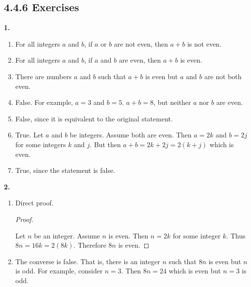 \documentclass[10pt,]{book}
\theoremstyle{plain}
\theoremstyle{definition}
\theoremstyle{definition}
\theoremstyle{definition}
\numberwithin{equation}{chapter}
\begin{document}
\subsection*{4.4.6 Exercises}
\noindent\textbf{1.}\quad{}\leavevmode%
\begin{enumerate}[label=(\alph*)]
\item\hypertarget{li-1098}{}
For all integers \(a\) and \(b\), if \(a\) or \(b\) are not even, then \(a+b\) is not even.
%
\item\hypertarget{li-1099}{}
For all integers \(a\) and \(b\), if \(a\) and \(b\) are even, then \(a+b\) is even.
%
\item\hypertarget{li-1100}{}
There are numbers \(a\) and \(b\) such that \(a+b\) is even but \(a\) and \(b\) are not both even.
%
\item\hypertarget{li-1101}{}
False.  For example, \(a = 3\) and \(b = 5\).  \(a+b = 8\), but neither \(a\) nor \(b\) are even.
%
\item\hypertarget{li-1102}{}
False, since it is equivalent to the original statement.
%
\item\hypertarget{li-1103}{}
True.  Let \(a\) and \(b\) be integers.  Assume both are even.  Then \(a = 2k\) and \(b = 2j\) for some integers \(k\) and \(j\).  But then \(a+b = 2k + 2j = 2(k+j)\) which is even.
%
\item\hypertarget{li-1104}{}
True, since the statement is false.
%
\end{enumerate}
\par\smallskip
\noindent\textbf{2.}\quad{}\leavevmode%
\begin{enumerate}[label=(\alph*)]
\item\hypertarget{li-1107}{}
Direct proof.

\begin{proof}\hypertarget{proof-42}{}

Let \(n\) be an integer. Assume \(n\) is even. Then \(n = 2k\) for some integer \(k\). Thus \(8n = 16k = 2(8k)\). Therefore \(8n\) is even.
%
\end{proof}


%
\item\hypertarget{li-1108}{}
The converse is false.  That is, there is an integer \(n\) such that \(8n\) is even but \(n\) is odd.  For example, consider \(n = 3\).  Then \(8n = 24\) which is even but \(n = 3\) is odd.
%
\end{enumerate}
\par\smallskip
\end{document}
